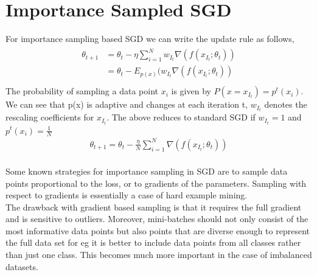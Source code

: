 \documentclass[a4paper,twoside]{iiththesis}
\theoremstyle{definition}
\theoremstyle{definition}
\theoremstyle{remark}
\begin{document}
\section{Importance Sampled SGD}
For importance sampling based SGD we can write the update rule as follows, 
% 
% 
\begin{align}
\begin{split}
    \theta_{t+1} &=\theta_t - \eta \sum_{i=1}^N w_{I_t} \nabla(f(x_{I_t}; \theta_t))\\ 
    &= \theta_t - E_{p(x)} (w_{I_t} \nabla(f(x_{I_t}; \theta_t))\\
\end{split}
\end{align}
The probability of sampling a data point $x_i$ is given by $P (x = x_{I_t}) = p^t (x_i)$. We can see that p(x) is adaptive and changes at each iteration t, $w_{I_t}$ denotes the rescaling coefficients for $x_{I_t}$.
% 
% 
The above reduces to standard SGD if $w_{I_t} = 1$ and $p^t(x_i) = \frac{1}{N}$
\begin{align}
    \theta_{t+1}= \theta_t- \frac{\eta}{N} \sum_{i=1}^N  \nabla(f(x_{I_t}; \theta_t))\\
\end{align}

Some known strategies for importance sampling in SGD are to sample data points proportional to the loss, or to gradients of the parameters. Sampling with respect to gradients is essentially a case of hard example mining. \\
The drawback with gradient based sampling is that it requires the full gradient and is sensitive to outliers. Moreover, mini-batches should not only consist of the most informative data points but also points that are diverse enough to represent the full data set for eg it is better to include data points from all classes rather than just one class. This becomes much more important in the case of imbalanced datasets. \\
\end{document}
